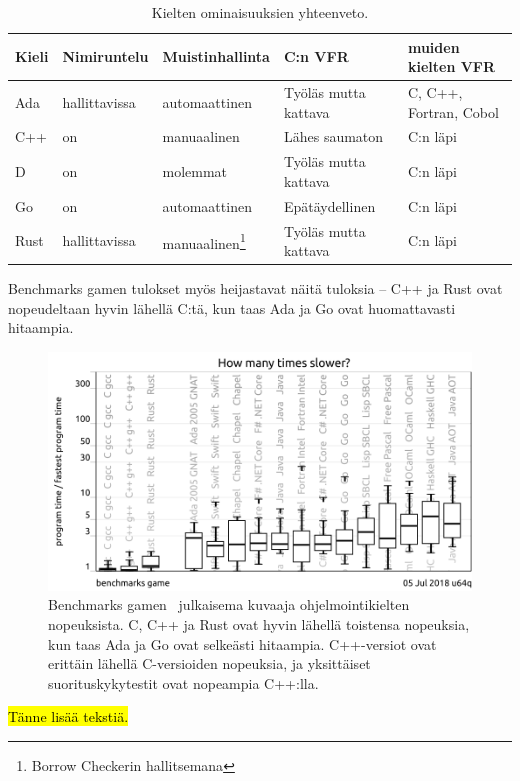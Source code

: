 \begin{table}[ht!]
    \begin{adjustbox}{center}
    \begin{tabular}{@{}lllll@{}} \toprule
        Kieli & Nimiruntelu   & Muistinhallinta                                     & C:n VFR               & muiden kielten VFR \\ \midrule
        Ada   & hallittavissa & automaattinen                                       & Työläs mutta kattava  & C, C++, Fortran, Cobol \\
        C++   & on            & manuaalinen                                         & Lähes saumaton        & C:n läpi \\
        D     & on            & molemmat                                            & Työläs mutta kattava  & C:n läpi \\
        Go    & on            & automaattinen                                       & Epätäydellinen        & C:n läpi \\
        Rust  & hallittavissa & manuaalinen\footnote{Borrow Checkerin hallitsemana} & Työläs mutta kattava  & C:n läpi \\ \bottomrule
    \end{tabular}
    \end{adjustbox}
    \caption{
        Kielten ominaisuuksien yhteenveto.
    }
    \label{table:properties}
\end{table}

\FloatBarrier

\newpage

Benchmarks gamen tulokset myös heijastavat näitä tuloksia -- C++ ja Rust ovat
nopeudeltaan hyvin lähellä C:tä, kun taas Ada ja Go ovat huomattavasti
hitaampia.

\FloatBarrier

\begin{figure}[ht!]
    \includegraphics[width=\textwidth]{benchmarksgame.png}
    \caption{
        Benchmarks gamen~\citep{benchmarks} julkaisema kuvaaja
        ohjelmointikielten nopeuksista. C, C++ ja Rust ovat hyvin lähellä
        toistensa nopeuksia, kun taas Ada ja Go ovat selkeästi hitaampia.
        C++-versiot ovat erittäin lähellä C-versioiden nopeuksia, ja
        yksittäiset suorituskykytestit ovat nopeampia C++:lla.
    }
    \label{fig:benchmarksgame}
\end{figure}

\FloatBarrier

\hl{Tänne lisää tekstiä.}
